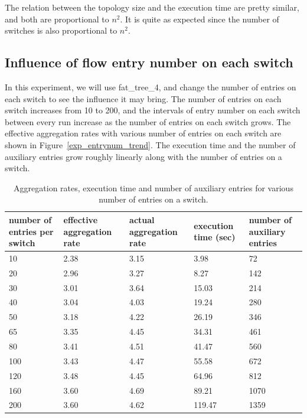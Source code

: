 \documentclass[conference]{IEEEtran}
\begin{document}
The relation between the topology size and the execution time are pretty similar, and both are proportional to $n^2$. It is quite as expected since the number of switches is also proportional to $n^2$.

\subsection{Influence of flow entry number on each switch}
In this experiment, we will use fat\_tree\_4, and change the number of entries on each switch to see the influence it may bring. The number of entries on each switch increases from 10 to 200, and the intervals of entry number on each switch between every run increase as the number of entries on each switch grows. The effective aggregation rates with various number of entries on each switch are shown in Figure~\ref{exp_entrynum_trend}. The execution time and the number of auxiliary entries grow roughly linearly along with the number of entries on a switch.

\begin{table}[ht]
\centering
\caption{Aggregation rates, execution time and number of auxiliary entries for various number of entries on a switch.}
\begin{tabular}{|p{1.8cm}|p{1.4cm}|p{1.3cm}|p{1.1cm}|p{1.3cm}|}
\hline number of entries per switch & effective aggregation rate & actual aggregation rate & execution time (sec) & number of auxiliary entries \\
\hline
\hline 10 & 2.38 & 3.15 & 3.98 & 72 \\
\hline 20 & 2.96 & 3.27 & 8.27 & 142 \\
\hline 30 & 3.01 & 3.64 & 15.03 & 214 \\
\hline 40 & 3.04 & 4.03 & 19.24 & 280 \\
\hline 50 & 3.18 & 4.22 & 26.19 & 346 \\
\hline 65 & 3.35 & 4.45 & 34.31 & 461 \\
\hline 80 & 3.41 & 4.51 & 41.47 & 560 \\
\hline 100 & 3.43 & 4.47 & 55.58 & 672 \\
\hline 120 & 3.48 & 4.45 & 64.96 & 812 \\
\hline 160 & 3.60 & 4.69 & 89.21 & 1070 \\
\hline 200 & 3.60 & 4.62 & 119.47 & 1359 \\
\hline 
\end{tabular}
\label{table:different_entry_per_switch}
\end{table}
\end{document}
